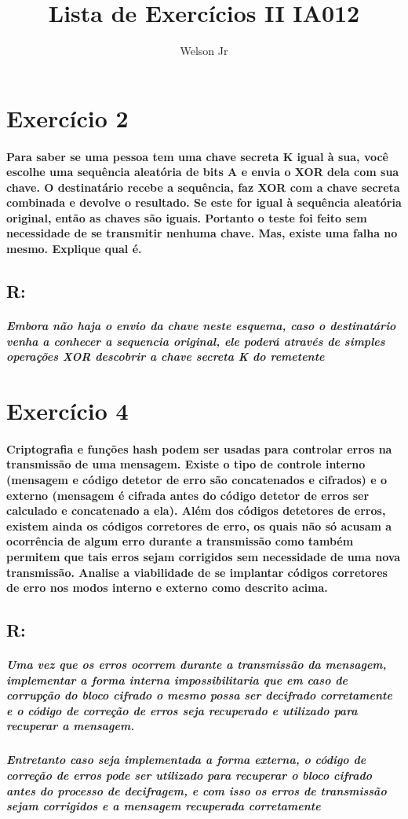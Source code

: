 \documentclass[10pt,a4paper]{report}
\author{Welson Jr}
\title{Lista de Exercícios II IA012}
\begin{document}
\maketitle
\section*{Exercício 2}
\paragraph{Para saber se uma pessoa tem uma chave secreta K igual à sua, você escolhe uma sequência aleatória de bits A e envia o XOR dela com sua chave. O destinatário recebe a sequência, faz XOR com a chave secreta combinada e devolve o resultado. Se este for igual à sequência aleatória original, então as chaves são iguais. Portanto o teste foi feito sem necessidade de se transmitir nenhuma chave. Mas, existe uma falha no mesmo. Explique qual é.}
\subsection*{R:}
\subparagraph{Embora não haja o envio da chave neste esquema, caso o destinatário venha a conhecer a sequencia original, ele poderá através de simples operações XOR descobrir a chave secreta K do remetente}

\section*{Exercício 4}
\paragraph{ Criptografia e funções hash podem ser usadas para controlar erros na transmissão de uma mensagem. Existe o tipo de controle interno (mensagem e código detetor de erro são concatenados e cifrados) e o externo (mensagem é cifrada antes do código detetor de erros ser calculado e concatenado a ela). Além dos códigos detetores de erros, existem ainda os códigos corretores de erro, os quais não só acusam a ocorrência de algum erro durante a transmissão como também permitem que tais erros sejam corrigidos sem necessidade de uma nova transmissão. Analise a viabilidade de se implantar códigos corretores de erro nos modos interno e externo como descrito acima.}
\subsection*{R:}
\subparagraph{Uma vez que os erros ocorrem durante a transmissão da mensagem, implementar a forma interna impossibilitaria que em caso de corrupção do  bloco cifrado o mesmo possa ser decifrado corretamente e o código de correção de erros seja recuperado e utilizado para recuperar a mensagem.}
\subparagraph{Entretanto caso seja implementada a forma externa, o código de correção de erros pode ser utilizado para recuperar o bloco cifrado antes do processo de decifragem, e com isso os erros de transmissão sejam corrigidos e a mensagem recuperada corretamente}
\end{document}
